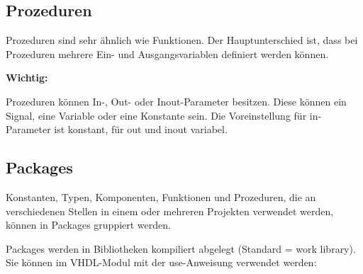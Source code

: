 \subsection{Prozeduren}
Prozeduren sind sehr ähnlich wie Funktionen. Der Hauptunterschied ist, dass bei Prozeduren mehrere Ein- und Ausgangsvariablen definiert werden können.

\textbf{Wichtig: }
\begin{compactitem}
    \item Prozeduren können In-, Out- oder Inout-Parameter besitzen. Diese können ein Signal, eine Variable oder eine Konstante sein. Die Voreinstellung für in-Parameter ist konstant, für out und inout variabel.
\end{compactitem}

\subsection{Packages}
Konstanten, Typen, Komponenten, Funktionen und Prozeduren, die an verschiedenen Stellen in einem oder mehreren Projekten verwendet werden, können in Packages gruppiert werden.

Packages werden in Bibliotheken kompiliert abgelegt (Standard = work library). Sie können im VHDL-Modul mit der use-Anweisung verwendet werden:

